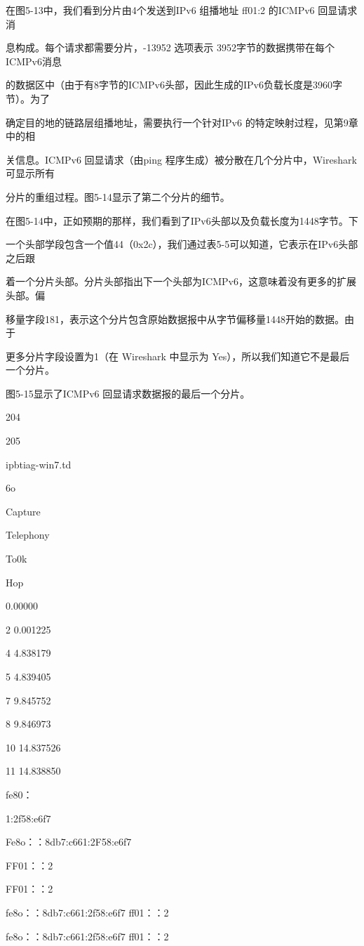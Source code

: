 在图5-13中，我们看到分片由4个发送到IPv6 组播地址 ff01:2 的ICMPv6 回显请求消

息构成。每个请求都需要分片，-13952 选项表示 3952字节的数据携带在每个ICMPv6消息

的数据区中（由于有8字节的ICMPv6头部，因此生成的IPv6负载长度是3960字节）。为了

确定目的地的链路层组播地址，需要执行一个针对IPv6 的特定映射过程，见第9章中的相

关信息。ICMPv6 回显请求（由ping 程序生成）被分散在几个分片中，Wireshark 可显示所有

分片的重组过程。图5-14显示了第二个分片的细节。

在图5-14中，正如预期的那样，我们看到了IPv6头部以及负载长度为1448字节。下

一个头部学段包含一个值44（0x2c），我们通过表5-5可以知道，它表示在IPv6头部之后跟

着一个分片头部。分片头部指出下一个头部为ICMPv6，这意味着没有更多的扩展头部。偏

移量字段181，表示这个分片包含原始数据报中从字节偏移量1448开始的数据。由于

更多分片字段设置为1（在 Wireshark 中显示为 Yes），所以我们知道它不是最后一个分片。

图5-15显示了ICMPv6 回显请求数据报的最后一个分片。

204

205

ipbtiag-win7.td

6o

Capture

Telephony

To0k

Hop

0.00000

2 0.001225

4 4.838179

5 4.839405

7 9.845752

8 9.846973

10 14.837526

11 14.838850

fe80：

1:2f58:e6f7

Fe8o：：8db7:c661:2F58:e6f7

FF01：：2

FF01：：2

fe8o：：8db7:c661:2f58:e6f7 ff01：：2

fe8o：：8db7:c661:2f58:e6f7 ff01：：2

